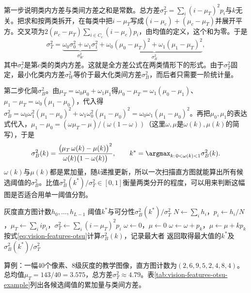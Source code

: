 第一步说明类内方差与类间方差之和是常数。总方差$\sigma_T^2=\sum_i(i-\mu_T)^2p_i$与$k$无关。把求和按两类拆开，在每类中把$i-\mu_T$写成$(i-\mu_c)+(\mu_c-\mu_T)$并展开平方。交叉项为$2(\mu_c-\mu_T)\sum_{i\in C_c}(i-\mu_c)p_i$，由均值的定义，这个和为零。于是
\[
  \sigma_T^2=\underbrace{\omega_0\sigma_0^2+\omega_1\sigma_1^2}_{\sigma_W^2}
  +\underbrace{\omega_0(\mu_0-\mu_T)^2+\omega_1(\mu_1-\mu_T)^2}_{\sigma_B^2},
\]
其中$\sigma_c^2$是第$c$类的类内方差。这就是全方差公式在两类情形下的形式。由于$\sigma_T^2$固定，最小化类内方差$\sigma_W^2$等价于最大化类间方差$\sigma_B^2$，而后者只需要一阶统计量。

第二步化简$\sigma_B^2$。由$\mu_T=\omega_0\mu_0+\omega_1\mu_1$得$\mu_0-\mu_T=\omega_1(\mu_0-\mu_1)$、$\mu_1-\mu_T=\omega_0(\mu_1-\mu_0)$，代入得$\sigma_B^2=\omega_0\omega_1^2(\mu_1-\mu_0)^2+\omega_1\omega_0^2(\mu_1-\mu_0)^2=\omega_0\omega_1(\mu_1-\mu_0)^2$。再把$\mu_0,\mu_1$的表达式代入，$\mu_1-\mu_0=(\omega\mu_T-\mu)/(\omega(1-\omega))$（这里$\omega,\mu$是$\omega(k),\mu(k)$的简写），于是
\begin{equation}
  \sigma_B^2(k)=\frac{\bigl(\mu_T\,\omega(k)-\mu(k)\bigr)^2}{\omega(k)\bigl(1-\omega(k)\bigr)},\qquad
  k^*=\argmax_{k:\,0<\omega(k)<1}\sigma_B^2(k).
  \label{eq:vision-features-otsu}
\end{equation}
$\omega(k)$与$\mu(k)$都是累加量，随$k$递推更新，所以一次扫描直方图就能算出所有候选阈值的$\sigma_B^2$。比值$\sigma_B^2(k^*)/\sigma_T^2\in[0,1]$衡量两类分开的程度，可以用来判断这幅图是否适合用单一阈值分割。

\begin{algorithm}[Otsu阈值选择]
  \label{alg:vision-features-otsu}
  \begin{algorithmic}[1]
    \Require 灰度直方图计数$h_0,\ldots,h_{L-1}$
    \Ensure 阈值$k^*$与可分性$\sigma_B^2(k^*)/\sigma_T^2$
    \State $N\gets\sum_ih_i$，$p_i\gets h_i/N$，$\mu_T\gets\sum_iip_i$，$\sigma_T^2\gets\sum_i(i-\mu_T)^2p_i$
    \State $\omega\gets0$，$\mu\gets0$
      \State $\omega\gets\omega+p_k$，$\mu\gets\mu+kp_k$
        \State 按式\eqref{eq:vision-features-otsu}计算$\sigma_B^2(k)$，记录最大者
      \EndIf
    \EndFor
    \State 返回取得最大值的$k^*$及$\sigma_B^2(k^*)/\sigma_T^2$
  \end{algorithmic}
\end{algorithm}

算例：一幅40个像素、8级灰度的教学图像，直方图计数为$(2,\allowbreak6,\allowbreak9,\allowbreak5,\allowbreak2,\allowbreak4,\allowbreak8,\allowbreak4)$。总均值$\mu_T=143/40=3.575$，总方差$\sigma_T^2\approx4.79$。表\ref{tab:vision-features-otsu-example}列出各候选阈值的累加量与类间方差。


